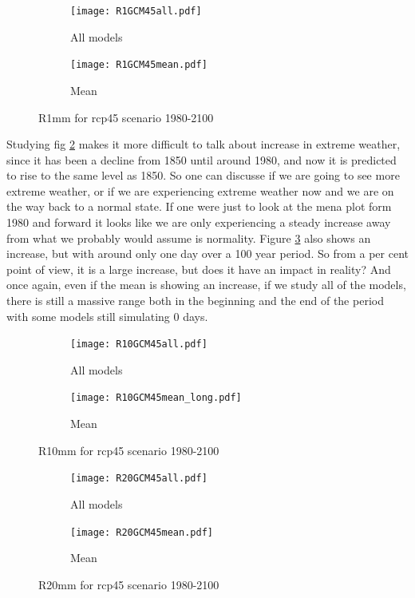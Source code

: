 \documentclass{article}
\begin{document}
\begin{figure}[H]
	\centering
	\begin{subfigure}{0.5\textwidth}
		\centering
		\texttt{[image: R1GCM45all.pdf]}
		\caption{All models}
	\end{subfigure}%
	\begin{subfigure}{0.5\textwidth}
		\centering
		\texttt{[image: R1GCM45mean.pdf]}
		\caption{Mean}
	\end{subfigure}
	\caption{R1mm for rcp45 scenario 1980-2100}
	\label{R1GCM45}
\end{figure}
Studying fig \ref{R10GCM45} makes it more difficult to talk about increase in extreme weather, since it has been a decline from 1850 until around 1980, and now it is predicted to rise to the same level as 1850. So one can discusse if we are going to see more extreme weather, or if we are experiencing extreme weather now and we are on the way back to a normal state. If one were just to look at the mena plot form 1980 and forward it looks like we are only experiencing a steady increase away from what we probably would assume is normality. Figure \ref{R20GCM45} also shows an increase, but with around only one day over a 100 year period. So from a per cent point of view, it is a large increase, but does it have an impact in reality? And once again, even if the mean is showing an increase, if we study all of the models, there is still a massive range both in the beginning and the end of the period with some models still simulating 0 days. 
\begin{figure}[H]
	\centering
	\begin{subfigure}{0.5\textwidth}
		\centering
		\texttt{[image: R10GCM45all.pdf]}
		\caption{All models}
	\end{subfigure}%
	\begin{subfigure}{0.5\textwidth}
		\centering
		\texttt{[image: R10GCM45mean\_long.pdf]}
		\caption{Mean}
	\end{subfigure}
	\caption{R10mm for rcp45 scenario 1980-2100}
	\label{R10GCM45}
\end{figure}

\begin{figure}[H]
	\centering
	\begin{subfigure}{0.5\textwidth}
		\centering
		\texttt{[image: R20GCM45all.pdf]}
		\caption{All models}
	\end{subfigure}%
	\begin{subfigure}{0.5\textwidth}
		\centering
		\texttt{[image: R20GCM45mean.pdf]}
		\caption{Mean}
	\end{subfigure}
	\caption{R20mm for rcp45 scenario 1980-2100}
	\label{R20GCM45}
\end{figure}
\end{document}
